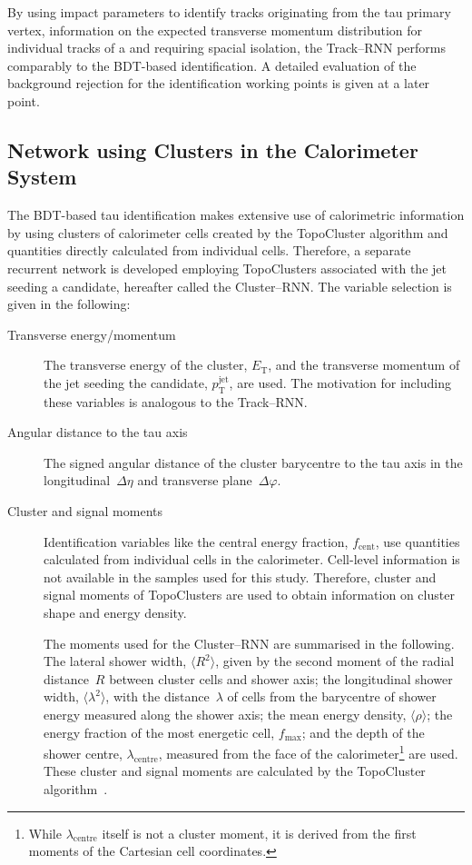 By using impact parameters to identify tracks originating from the tau primary
vertex, information on the expected transverse momentum distribution for
individual tracks of a \tauhadvis and requiring spacial isolation, the
Track--RNN performs comparably to the BDT-based identification. A detailed
evaluation of the background rejection for the identification working points is
given at a later point.

\subsection{Network using Clusters in the Calorimeter System}
\label{sec:rnn_clusters}

The BDT-based tau identification makes extensive use of calorimetric information
by using clusters of calorimeter cells created by the TopoCluster algorithm and
quantities directly calculated from individual cells. Therefore, a separate
recurrent network is developed employing TopoClusters associated with the jet
seeding a \tauhadvis candidate, hereafter called the Cluster--RNN. The variable
selection is given in the following:
\begin{description}
\item[Transverse energy/momentum] The transverse energy of the cluster,
  $E_\text{T}$, and the transverse momentum of the jet seeding the \tauhadvis
  candidate, $p_\text{T}^\text{jet}$, are used. The motivation for including
  these variables is analogous to the Track--RNN.

\item[Angular distance to the tau axis] The signed angular distance of the
  cluster barycentre to the tau axis in the longitudinal~$\Delta \eta$ and
  transverse plane~$\Delta \varphi$.

\item[Cluster and signal moments] Identification variables like the central
  energy fraction, $f_\text{cent}$, use quantities calculated from individual
  cells in the calorimeter. Cell-level information is not available in the
  samples used for this study. Therefore, cluster and signal moments of
  TopoClusters are used to obtain information on cluster shape and energy
  density.

  The moments used for the Cluster--RNN are summarised in the following. The
  lateral shower width, $\langle R^2 \rangle$, given by the second moment of the
  radial distance~$R$ between cluster cells and shower axis; the longitudinal
  shower width, $\langle \lambda^2 \rangle$, with the distance~$\lambda$ of
  cells from the barycentre of shower energy measured along the shower axis; the
  mean energy density, $\langle \rho \rangle$; the energy fraction of the most
  energetic cell, $f_\text{max}$; and the depth of the shower centre,
  $\lambda_\text{centre}$, measured from the face of the
  calorimeter\footnote{While $\lambda_\text{centre}$ itself is not a cluster
    moment, it is derived from the first moments of the Cartesian cell
    coordinates.} are used. These cluster and signal moments are calculated by
  the TopoCluster algorithm~\cite{atlas_topoclustering}.
\end{description}
